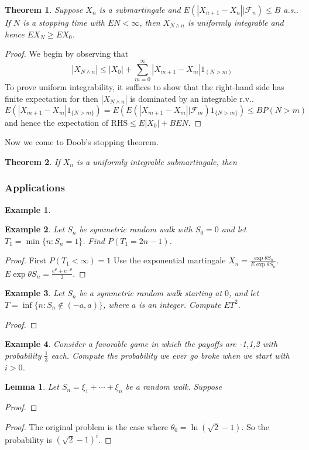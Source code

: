 \documentclass{article}
\newtheorem{Thm}{Theorem}[section]
\newtheorem{Lem}{Lemma}[section]
\newtheorem{Eg}{Example}[section]
\theoremstyle{definition}
\begin{document}
\begin{Thm}
    Suppose $X_n$ is a submartingale and $E(|X_{n+1}-X_n||\mathcal{F}_n)\le B$ a.s..
    If $N$ is a stopping time with $EN<\infty$, then $X_{N\wedge n}$ is uniformly integrable
    and hence $EX_N\ge EX_0$.
\end{Thm}
\begin{proof}
    We begin by observing that \[|X_{N\wedge n}|\le |X_0|+\sum_{m=0}^\infty|X_{m+1}-X_m|1_{(N>m)}\] 
    To prove uniform integrability, it suffices to show that the right-hand side has finite expectation for then $|X_{N\wedge n}|$ is dominated by an integrable r.v..\newline 
    \[ E(|X_{m+1}-X_m|1_{\{N>m\}})=E(E(|X_{m+1}-X_m||\mathcal{F}_m)1_{\{N>m\}})\le BP(N>m)\] 
    and hence the expectation of RHS$\le E|X_0|+BEN$.
\end{proof}

Now we come to Doob's stopping theorem.
\begin{Thm}
    If $X_n$ is a uniformly integrable submartingale, then 
\end{Thm}


\subsubsection{Applications}
\begin{Eg}
    
\end{Eg}

\begin{Eg}
    Let $S_n$ be symmetric random walk with $S_0=0$ and let $T_1=\min\{n:S_n=1\}$.
    Find $P(T_1=2n-1)$.
\end{Eg}
\begin{proof}
    First $P(T_1<\infty)=1$
    Use the exponential martingale $X_n=\frac{\exp{\theta S_n}}{E\exp{\theta S_n}}$. $E\exp{\theta S_n}=\frac{e^\theta+e^{-\theta}}{2}$.
\end{proof}

\begin{Eg}
    Let $S_n$ be a symmetric random walk starting at $0$, and let $T=\inf\{n:S_n\notin (-a,a)\}$,
    where $a$ is an integer. Compute $ET^2$.
\end{Eg}
\begin{proof}
    
\end{proof}

\begin{Eg}
    Consider a favorable game in which the payoffs are -1,1,2 with probability $\frac{1}{3}$ each. Compute the probability 
    we ever go broke when we start with $i>0$.
\end{Eg}
\begin{Lem}
    Let $S_n=\xi_1+\cdots+\xi_n$ be a random walk. Suppose  
\end{Lem}
\begin{proof}
    
\end{proof}
\begin{proof}
    The original problem is the case where $\theta_0=\ln (\sqrt{2}-1)$. So the probability is $(\sqrt{2}-1)^i$.
\end{proof}
\end{document}
